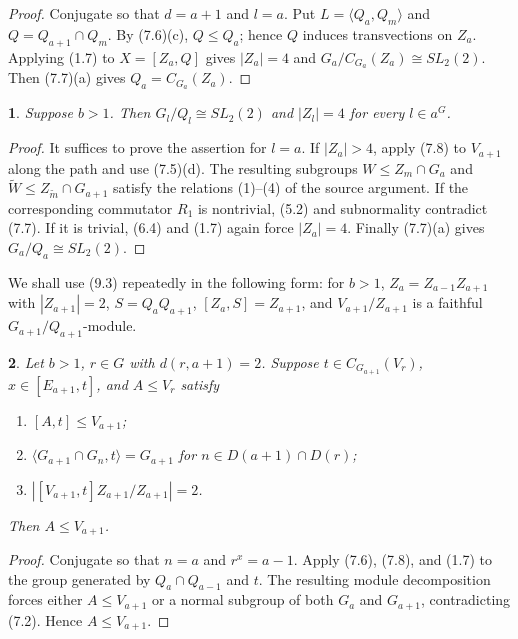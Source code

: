 \documentclass[11pt]{article}
\theoremstyle{plain}
\theoremstyle{stmplain}
\newtheorem{stm}{}[section]
\begin{document}
\begin{proof}
Conjugate so that $d=a+1$ and $l=a$. Put
$L=\langle Q_a,Q_m\rangle$ and $Q=Q_{a+1}\cap Q_m$.
By (7.6)(c), $Q\le Q_a$; hence $Q$ induces transvections on $Z_a$.
Applying (1.7) to $X=[Z_a,Q]$ gives $|Z_a|=4$ and
$G_a/C_{G_a}(Z_a)\cong SL_2(2)$. Then (7.7)(a) gives
$Q_a=C_{G_a}(Z_a)$.
\end{proof}

\begin{stm}\label{st:9.3}
Suppose $b>1$. Then $G_l/Q_l\cong SL_2(2)$ and $|Z_l|=4$ for
every $l\in a^G$.
\end{stm}

\begin{proof}
It suffices to prove the assertion for $l=a$. If $|Z_a|>4$, apply
(7.8) to $V_{a+1}$ along the path and use (7.5)(d). The resulting
subgroups $W\le Z_m\cap G_a$ and $\widetilde W\le Z_{\widetilde m}\cap
G_{a+1}$ satisfy the relations (1)--(4) of the source argument.
If the corresponding commutator $R_1$ is nontrivial, (5.2) and
subnormality contradict (7.7). If it is trivial, (6.4) and (1.7) again
force $|Z_a|=4$. Finally (7.7)(a) gives
$G_a/Q_a\cong SL_2(2)$.
\end{proof}

\noindent We shall use (9.3) repeatedly in the following form: for $b>1$,
$Z_a=Z_{a-1}Z_{a+1}$ with $|Z_{a+1}|=2$, $S=Q_aQ_{a+1}$,
$[Z_a,S]=Z_{a+1}$, and $V_{a+1}/Z_{a+1}$ is a faithful
$G_{a+1}/Q_{a+1}$-module.

\begin{stm}\label{st:9.4}
Let $b>1$, $r\in G$ with $d(r,a+1)=2$. Suppose
$t\in C_{G_{a+1}}(V_r)$, $x\in[E_{a+1},t]$, and $A\le V_r$ satisfy
\begin{enumerate}
\item[(i)] $[A,t]\le V_{a+1}$;
\item[(ii)] $\langle G_{a+1}\cap G_n,t\rangle=G_{a+1}$ for
  $n\in D(a+1)\cap D(r)$;
\item[(iii)] $|[V_{a+1},t]Z_{a+1}/Z_{a+1}|=2$.
\end{enumerate}
Then $A\le V_{a+1}$.
\end{stm}

\begin{proof}
Conjugate so that $n=a$ and $r^x=a-1$. Apply (7.6), (7.8), and
(1.7) to the group generated by $Q_a\cap Q_{a-1}$ and $t$. The
resulting module decomposition forces either $A\le V_{a+1}$ or a normal
subgroup of both $G_a$ and $G_{a+1}$, contradicting (7.2). Hence
$A\le V_{a+1}$.
\end{proof}
\end{document}
